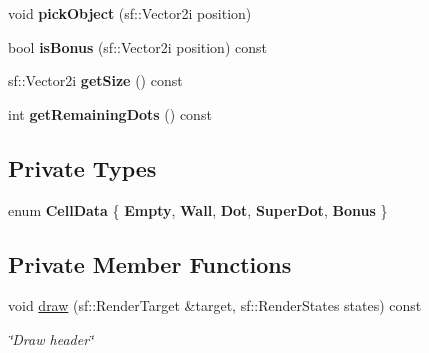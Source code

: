 \begin{DoxyCompactItemize}
\item 
\mbox{\label{classMaze_ae1daeb817da3d4bf5bff6ce3ab255da2}} 
void {\bfseries pick\+Object} (sf\+::\+Vector2i position)
\item 
\mbox{\label{classMaze_a5c5b0b9b20d7869de0bf6dda5a0a433d}} 
bool {\bfseries is\+Bonus} (sf\+::\+Vector2i position) const
\item 
\mbox{\label{classMaze_a664b89e39391a1551babb93556cb36f8}} 
sf\+::\+Vector2i {\bfseries get\+Size} () const
\item 
\mbox{\label{classMaze_afe0905b13aaefd6135346b3cda931556}} 
int {\bfseries get\+Remaining\+Dots} () const
\end{DoxyCompactItemize}
\subsection*{Private Types}
\begin{DoxyCompactItemize}
\item 
\mbox{\label{classMaze_a6d75ad7c29ef6cab2adfb13933ac6de9}} 
enum {\bfseries Cell\+Data} \{ \newline
{\bfseries Empty}, 
{\bfseries Wall}, 
{\bfseries Dot}, 
{\bfseries Super\+Dot}, 
\newline
{\bfseries Bonus}
 \}
\end{DoxyCompactItemize}
\subsection*{Private Member Functions}
\begin{DoxyCompactItemize}
\item 
void \hyperlink{classMaze_a50e027e616c734c6c4b117ed04576539}{draw} (sf\+::\+Render\+Target \&target, sf\+::\+Render\+States states) const
\begin{DoxyCompactList}\small\item\em \char`\"{}\+Draw header\char`\"{} \end{DoxyCompactList}\end{DoxyCompactItemize}
